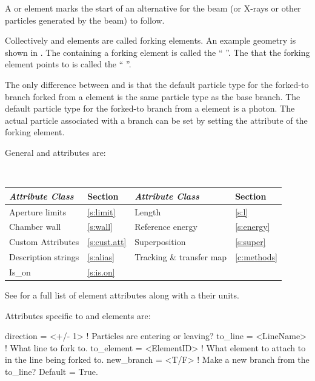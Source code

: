 A  or  element marks the start of an alternative  for the beam
(or X-rays or other particles generated by the beam) to follow.

Collectively  and  elements are called forking elements. An example
geometry is shown in .  The  containing a forking element is called the
`` ''. The  that the forking element points to is called the
`` ''.

The only difference between  and  is that the default particle type for the
forked-to branch forked from a  element is the same particle type as the base branch. The
default particle type for the forked-to branch from a  element is a photon. The actual
particle associated with a branch can be set by setting the  attribute of the forking
element.

General  and  attributes are:
\begin{center}
\tt
\begin{tabular}{llll} \toprule
  {\sl Attribute Class}      & Section           & {\sl Attribute Class}      & Section         \\ \midrule
  Aperture limits            & \ref{s:limit}     & Length                     & \ref{s:l}       \\
  Chamber wall               & \ref{s:wall}      & Reference energy           & \ref{s:energy}  \\ 
  Custom Attributes          & \ref{s:cust.att}  & Superposition              & \ref{s:super}   \\
  Description strings        & \ref{s:alias}     & Tracking \& transfer map   & \ref{c:methods} \\ 
  Is_on                      & \ref{s:is.on}     &                            &                 \\
  \bottomrule
\end{tabular}
\end{center}
\toffset
See  for a full list of element attributes along with a their units.

Attributes specific to  and  elements are:
\begin{example}
  direction    = <+/- 1>      ! Particles are entering or leaving?
  to_line      = <LineName>   ! What line to fork to.
  to_element   = <ElementID>  ! What element to attach to in the line being forked to.
  new_branch   = <T/F>        ! Make a new branch from the to_line? Default = True.
\end{example}

